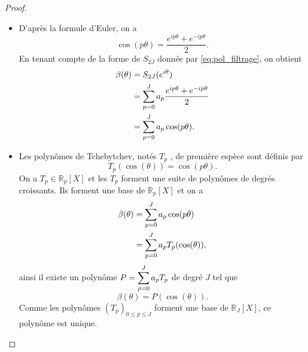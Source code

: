 \begin{proof}
\begin{itemize}
\item D'après la formule d'Euler, on a 
\begin{equation}
\cos (p \theta) = \dfrac{e^{ip \theta} + e^{-ip \theta}}{2}.
\end{equation}
En tenant compte de la forme de $S_{2J}$ donnée par \eqref{eq:pol_filtrage}, on obtient
\begin{align*}
\beta(\theta) & = S_{2J}(e^{i \theta}) \\
	& = \displaystyle\sum\limits_{p=0}^J a_p \dfrac{e^{ip \theta} + e^{-ip \theta}}{2} \\
	& = \displaystyle\sum\limits_{p=0}^J a_p \cos (p \theta).
\end{align*}

\item Les polynômes de Tchebytchev, notés $T_p$ , de première espèce sont définis par
\begin{equation}
T_p(\cos (\theta)) = \cos (p \theta).
\end{equation}
On a $T_p \in \mathbb{R}_p[X]$ et les $T_p$ forment une suite de polynômes de degrés croissants. Ils forment une base de $\mathbb{R}_p[X]$ et on a
\begin{align*}
\beta(\theta) & = \displaystyle\sum\limits_{p=0}^J a_p \cos (p \theta) \\
	& = \displaystyle\sum\limits_{p=0}^J a_p T_p( \cos (\theta)),
\end{align*}
ainsi il existe un polynôme $P = \displaystyle\sum\limits_{p=0}^J a_p T_p$ de degré $J$ tel que
\begin{equation}
\beta(\theta) = P(\cos (\theta)).
\end{equation}
Comme les polynômes $(T_p)_{0 \leq p \leq J}$ forment une base de $\mathbb{R}_{J}[X]$, ce polynôme est unique.


\end{itemize}
\end{proof}
